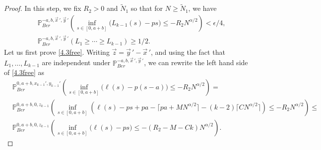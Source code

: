 \begin{proof}
	
	In this step, we fix $R_2 > 0$ and $\tilde{N}_1$ so that for $N\geq\tilde{N}_1$, we have
	\begin{align}
		&\mathbb{P}^{-a, b, \vec{x}\,', \vec{y}\,'}_{Ber} \left( \inf_{s\in[0,a+b]} \big(L_{k-1}(s) - ps\big) \leq -R_2 N^{\alpha/2} \right) < \epsilon/4, \label{4.3free}\\
		&\mathbb{P}^{-a, b, \vec{x}\,', \vec{y}\,'}_{Ber}(L_1 \geq \cdots \geq L_{k-1}) \geq 1/2. \label{4.3intersect}
	\end{align}
	Let us first prove \eqref{4.3free}. Writing $\vec{z} = \vec{y}\,' - \vec{x}\,'$, and using the fact that $L_1,\dots,L_{k-1}$ are independent under $\mathbb{P}^{-a, b, \vec{x}\,', \vec{y}\,'}_{Ber}$, we can rewrite the left hand side of \eqref{4.3free} as
	\begin{equation}\label{4.3R2}
		\begin{split}
			& \mathbb{P}^{0, a+b, x_{k-1}', y_{k-1}'}_{Ber} \left( \inf_{s\in[0,a+b]} \big(\ell(s) - p(s-a)\big) \leq -R_2 N^{\alpha/2} \right) =\\
			&\mathbb{P}^{0, a+b, 0, z_{k-1}}_{Ber} \left( \inf_{s\in[0,a+b]} \left(\ell(s) - ps + pa - \lceil pa + MN^{\alpha/2}\rceil - (k-2)\lceil CN^{\alpha/2}\rceil\right) \leq -R_2 N^{\alpha/2} \right) \leq \\
			& \mathbb{P}^{0, a+b, 0, z_{k-1}}_{Ber} \left( \inf_{s\in[0,a+b]} \big(\ell(s) - ps\big) \leq -(R_2 - M - Ck) N^{\alpha/2} \right).
		\end{split}
	\end{equation}
	
	
	
\end{proof}